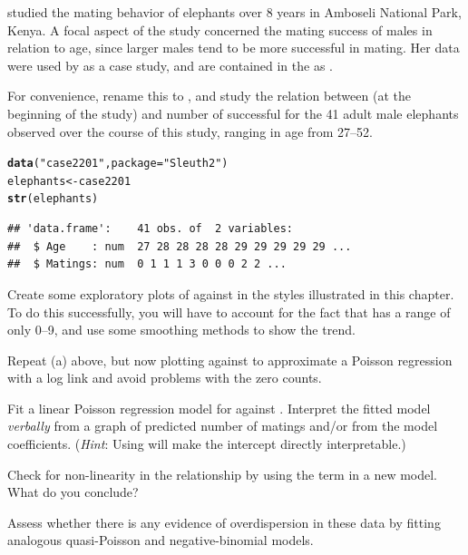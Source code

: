 \documentclass[11pt]{book}\usepackage[]{graphicx}\usepackage[]{color}
\makeatletter
\newcommand{\hlstr}[1]{\textcolor[rgb]{0.192,0.494,0.8}{#1}}%
\newcommand{\hlstd}[1]{\textcolor[rgb]{0.345,0.345,0.345}{#1}}%
\newcommand{\hlkwb}[1]{\textcolor[rgb]{0.69,0.353,0.396}{#1}}%
\newcommand{\hlkwc}[1]{\textcolor[rgb]{0.333,0.667,0.333}{#1}}%
\newcommand{\hlkwd}[1]{\textcolor[rgb]{0.737,0.353,0.396}{\textbf{#1}}}%
\newenvironment{kframe}{%
 \def\at@end@of@kframe{}%
 \ifinner\ifhmode%
  \def\at@end@of@kframe{\end{minipage}}%
  \begin{minipage}{\columnwidth}%
 \fi\fi%
 \def\FrameCommand##1{\hskip\@totalleftmargin \hskip-\fboxsep
 \colorbox{shadecolor}{##1}\hskip-\fboxsep
     \hskip-\linewidth \hskip-\@totalleftmargin \hskip\columnwidth}%
 \MakeFramed {\advance\hsize-\width
   \@totalleftmargin\z@ \linewidth\hsize
   \@setminipage}}%
 {\par\unskip\endMakeFramed%
 \at@end@of@kframe}
\newenvironment{knitrout}{}{} %
\renewenvironment{knitrout}{\small\renewcommand{\baselinestretch}{.85}}{} %
\makeatother
\begin{document}
\begin{Exercises}

  \exercise \citet{Poole:1989} studied the mating behavior of elephants over 8 years in Amboseli National Park,
  Kenya. A focal aspect of the study concerned the mating success of males in relation to age, since larger
  males tend to be more successful in mating.  Her data were used by \citet[]{RamseySchafer:2002} 
  as a case study, and are contained in the  \citep{Sleuth2} as .

  For convenience, rename this to , and study the relation between  
  (at the beginning of the study) and number of successful 
  for the 41 adult male elephants observed over the course of this study, ranging in age from 27--52.
\begin{knitrout}
\color{fgcolor}\begin{kframe}
\begin{alltt}
\hlkwd{data}\hlstd{(}\hlstr{"case2201"}\hlstd{,} \hlkwc{package}\hlstd{=}\hlstr{"Sleuth2"}\hlstd{)}
\hlstd{elephants} \hlkwb{<-} \hlstd{case2201}
\hlkwd{str}\hlstd{(elephants)}
\end{alltt}
\begin{verbatim}
## 'data.frame':	41 obs. of  2 variables:
##  $ Age    : num  27 28 28 28 28 29 29 29 29 29 ...
##  $ Matings: num  0 1 1 1 3 0 0 0 2 2 ...
\end{verbatim}
\end{kframe}
\end{knitrout}
  \begin{enumerate*}
    \item Create some exploratory plots of  against  in the styles illustrated in this chapter.
    To do this successfully, you will have to account for the fact that  has a range of only
    0--9, and use some smoothing methods to show the trend.
    \item Repeat (a) above, but now plotting  against  to approximate a
    Poisson regression with a log link and avoid problems with the zero counts.
    \item Fit a linear Poisson regression model for  against .  Interpret the
    fitted model \emph{verbally} from a graph of predicted number of matings and/or from the model
    coefficients. (\emph{Hint}: Using  will make the intercept directly interpretable.)
    \item Check for non-linearity in the relationship by using the term  in a new
    model.  What do you conclude?
    \item Assess whether there is any evidence of overdispersion in these data by fitting analogous
    quasi-Poisson and negative-binomial models.
  \end{enumerate*}


\end{Exercises}
\end{document}

